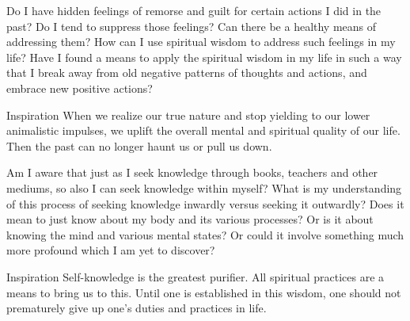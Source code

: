 \newpage
\begin{mananam}{} 
\mananamtext Do I have hidden feelings of remorse and guilt for certain actions I did in the past? Do I tend to suppress those feelings? Can there be a healthy means of addressing them? How can I use spiritual wisdom to address such feelings in my life? Have I found a means to apply the spiritual wisdom in my life in such a way that I break away from old negative patterns of thoughts and actions, and embrace new positive actions?
\end{mananam}
\WritingHand{}
\begin{inspiration}{\mananamfont Inspiration}
\mananamtext When we realize our true nature and stop yielding to our lower animalistic impulses, we uplift the overall mental and spiritual quality of our life. Then the past can no longer haunt us or pull us down.
\end{inspiration}
\newpage


\newpage
\begin{mananam}{} 
\mananamtext Am I aware that just as I seek knowledge through books, teachers and other mediums, so also I can seek knowledge within myself? What is my understanding of this process of seeking knowledge inwardly versus seeking it outwardly? Does it mean to just know about my body and its various processes? Or is it about knowing the mind and various mental states? Or could it involve something much more profound which I am yet to discover?
\end{mananam}
\WritingHand{}
\begin{inspiration}{\mananamfont Inspiration}
\mananamtext Self-knowledge is the greatest purifier. All spiritual practices are a means to bring us to this. Until one is established in this wisdom, one should not prematurely give up one’s duties and practices in life.  
\end{inspiration}
\newpage


